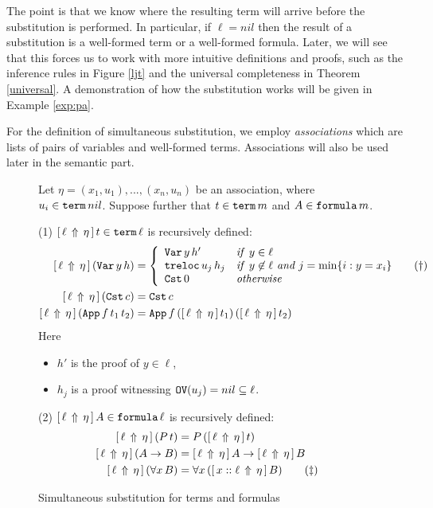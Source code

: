 \documentclass{kms-j}
\theoremstyle{plain}
\theoremstyle{remark}
\begin{document}
The point is that we know where
the resulting term will arrive before the substitution is performed.
In particular, if $\ell = nil$ then the result of a substitution is a well-formed term
or a well-formed formula.
Later, we will see that this forces us to work with more intuitive definitions and proofs,
such as the inference rules in Figure \ref{ljt}
and the universal completeness in Theorem \ref{universal}.
A demonstration of how the substitution works will be given in Example \ref{exp:pa}.

For the definition of simultaneous substitution, we employ {\em
  associations} which are lists of pairs of variables and well-formed
terms. Associations will also be used later in the semantic part.

\begin{figure}[t]
\raggedright
  Let $\eta = (x_1, u_1), ..., (x_n,u_n)$ be an association, where
  $u_i \in \textup{\tt term} \, nil$.
  Suppose further that $t \in \textup{\tt term} \, m$ and $A \in \textup{\tt formula} \, m$.
  \medskip

(1) $[\,\ell\, \Uparrow\, \eta\,]\, t \in \textup{\tt term}\, \ell$ is recursively defined:
  \begin{align}
    \substa{(\tBvar\, y \, h)}{\eta}{\ell} & =
    \left \{
    \begin{array}{ll}
      \tBvar\, y\, h' & \textit{if\,  $y \in \ell$}\\
      \ttlift\, u_j\, h_j & \textit{if\,  $y \not\in\ell$ and $j = \min \menge{i}{y = x_i}$} \label{eq:reloc}\tag{\dag}\\
      \tCst \, 0 & \textit{otherwise}
    \end{array} %
  \right .\\
    \substa{(\tCst\, c)}{\eta}{\ell} & =  \tCst\, c \nonumber \\
    \substa{(\tApp\, f\, t_1\, t_2)}{\eta}{\ell} & =  \tApp\, f\, (\substa{t_1}{\eta}{\ell})\, (\substa{t_2}{\eta}{\ell}) \nonumber
  \end{align}
  Here
  \begin{itemize}
  \item $h'$ is the proof of $y \in \ell$, %
  \item $h_j$ is a proof witnessing $\textup{\tt OV}(u_j) = nil \subseteq \ell$. \smallskip
  \end{itemize} \medskip

(2) $[\,\ell\, \Uparrow\, \eta\,]\, A \in \textup{\tt formula}\, \ell$ is recursively defined:
\begin{align}
  \substa{(P\, t)}{\eta}{\ell} & = P\, (\substa{t}{\eta}{\ell}) \nonumber\\
  \substa{(A \to B)}{\eta}{\ell} & = \substa{A}{\eta}{\ell} \to \substa{B}{\eta}{\ell} \nonumber\\
  \substa{(\forall x\, B)}{\eta}{\ell} & =  \forall x\, (\substa{B}{\eta}{x::\ell})\label{allBinder}\tag{\ddag}
\end{align}

\hrulefill
\caption{Simultaneous substitution for terms and formulas}
  \label{fig:substitution}
\end{figure}
\end{document}
